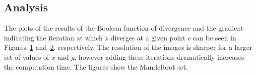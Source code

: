\documentclass{article}
\begin{document}
\subsection{Analysis}
The plots of the results of the Boolean function of divergence and the gradient indicating the iteration at which $z$ diverges at a given point $c$ can be seen in Figures~\ref{fig:q2a} and~\ref{fig:q2b}, respectively.  The resolution of the images is sharper for a larger set of values of $x$ and $y$, however adding these iterations dramatically increases the computation time.  The figures show the Mandelbrot set.

\begin{figure}[!h]
    \label{fig:q2a}
\end{figure}

\begin{figure}[!h]
    \label{fig:q2b}
\end{figure}
\end{document}
